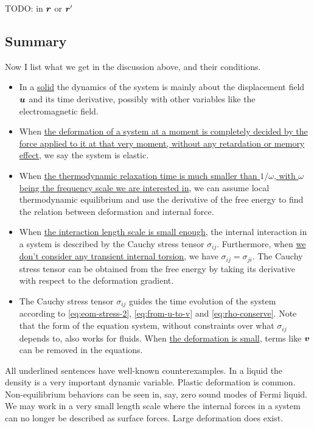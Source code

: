 \documentclass[hyperref, a4paper]{article}
\begin{document}
TODO: in $\vb*{r}$ or $\vb*{r}'$

\subsection{Summary}

Now I list what we get in the discussion above, 
and their conditions.
\begin{itemize}
    \item In a \ul{solid} the dynamics of the system is mainly about the 
        displacement field $\vb*{u}$ and its time derivative,
        possibly with other variables like the electromagnetic field.
    \item When \ul{the deformation of a system at a moment is completely decided by the force applied to 
    it at that very moment, 
    without any retardation or memory effect},
    we say the system is elastic.
    \item When \ul{the thermodynamic relaxation time is much smaller 
    than $1 / \omega$, with $\omega$ being the frequency scale we are interested in},
        we can assume local thermodynamic equilibrium
        and use the derivative of the free energy to find 
        the relation between deformation and internal force.
    \item When \ul{the interaction length scale is small enough}, 
    the internal interaction in a system is described by the Cauchy stress tensor $\sigma_{ij}$.
    Furthermore, when \ul{we don't consider any transient internal torsion}, 
    we have $\sigma_{ij} = \sigma_{ji}$.
    The Cauchy stress tensor can be obtained from the free energy 
    by taking its derivative with respect to the deformation gradient.
    \item The Cauchy stress tensor $\sigma_{ij}$ guides the time evolution of the system 
    according to \eqref{eq:eom-stress-2}, \eqref{eq:from-u-to-v} and \eqref{eq:rho-conserve}.
    Note that the form of the equation system,
    without constraints over what $\sigma_{ij}$ depends to,
    also works for fluids.
    When \ul{the deformation is small},
    terms like $\vb*{v}$ can be removed in the equations.
\end{itemize}

All underlined sentences have well-known counterexamples.
In a liquid the density is a very important dynamic variable.
Plastic deformation is common.
Non-equilibrium behaviors can be seen in, say, 
zero sound modes of Fermi liquid.
We may work in a very small length scale 
where the internal forces in a system can no longer be described 
as surface forces.
Large deformation does exist.
\end{document}
